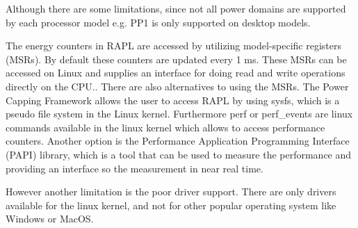 

Although there are some limitations, since not all power domains are supported by each processor model e.g. PP1 is only supported on desktop models. 

The energy counters in RAPL are accessed by utilizing model-specific registers (MSRs). By default these counters are updated every 1 ms. These MSRs can be accessed on Linux and supplies an interface for doing read and write operations directly on the CPU.\cite{linux_manual_msr}. There are also alternatives to using the MSRs. The Power Capping Framework allows the user to access RAPL by using sysfs, which is a pseudo file system in the Linux kernel\cite{PowerCappingFramework, RAPL_in_action}. Furthermore perf or perf_events are linux commands available in the linux kernel which allows to access performance counters. \cite{Perf_events,RAPL_in_action} Another option is the Performance Application Programming Interface (PAPI) library, which is a tool that can be used to measure the performance and providing an interface so the measurement in near real time\cite{PAPI}.\nytafsnit




However another limitation is the poor driver support. There are only drivers available for the linux kernel, and not for other popular operating system like Windows or MacOS.\cite{RAPL_in_action}  


